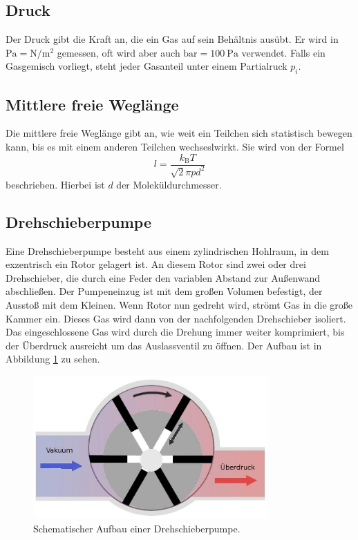 \subsection{Druck}
Der Druck gibt die Kraft an, die ein Gas auf sein Behältnis ausübt. Er wird in $\si{\pascal}=\si{\newton \per \meter \squared}$ gemessen, oft wird aber auch $\si{\bar}=\SI{100}{\pascal}$ verwendet. Falls ein Gasgemisch
vorliegt, steht jeder Gasanteil unter einem Partialruck $p_i$.
\subsection{Mittlere freie Weglänge}
Die mittlere freie Weglänge gibt an, wie weit ein Teilchen sich statistisch bewegen kann, bis es mit einem anderen Teilchen wechseslwirkt.
Sie wird von der Formel
\begin{equation}
	l=\frac{k_\text{B}T}{\sqrt{2}\pi p d^2}
\end{equation}
beschrieben. Hierbei ist $d$ der Moleküldurchmesser.

\subsection{Drehschieberpumpe}
Eine Drehschieberpumpe besteht aus einem zylindrischen Hohlraum, in dem exzentrisch ein Rotor gelagert ist. An diesem Rotor sind zwei oder drei Drehschieber,
die durch eine Feder den variablen Abstand zur Außenwand abschließen. Der Pumpeneinzug ist mit dem großen Volumen befestigt, der Ausstoß mit dem Kleinen.
Wenn Rotor nun gedreht wird, strömt Gas in die große Kammer ein. Dieses Gas wird dann von der nachfolgenden Drehschieber isoliert. Das eingeschlossene Gas wird
durch die Drehung immer weiter komprimiert, bis der Überdruck ausreicht um das Auslassventil zu öffnen. Der Aufbau ist in Abbildung \ref{img:drehpump} zu sehen.
\begin{figure}
	\centering
	\includegraphics[width=0.8\textwidth]{img/drehpump.jpg}
	\caption{Schematischer Aufbau einer Drehschieberpumpe.\cite{hoechs}}
	\label{img:drehpump}
\end{figure}
